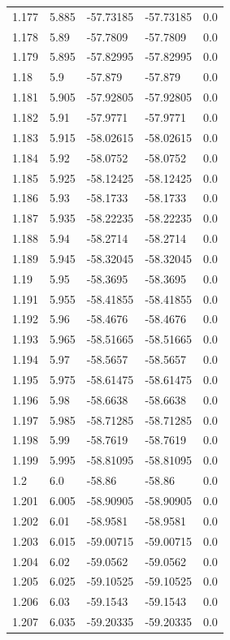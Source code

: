 \begin{tabular}{lllll}
1.177 & 5.885 & -57.73185 & -57.73185 & 0.0 \\
1.178 & 5.89 & -57.7809 & -57.7809 & 0.0 \\
1.179 & 5.895 & -57.82995 & -57.82995 & 0.0 \\
1.18 & 5.9 & -57.879 & -57.879 & 0.0 \\
1.181 & 5.905 & -57.92805 & -57.92805 & 0.0 \\
1.182 & 5.91 & -57.9771 & -57.9771 & 0.0 \\
1.183 & 5.915 & -58.02615 & -58.02615 & 0.0 \\
1.184 & 5.92 & -58.0752 & -58.0752 & 0.0 \\
1.185 & 5.925 & -58.12425 & -58.12425 & 0.0 \\
1.186 & 5.93 & -58.1733 & -58.1733 & 0.0 \\
1.187 & 5.935 & -58.22235 & -58.22235 & 0.0 \\
1.188 & 5.94 & -58.2714 & -58.2714 & 0.0 \\
1.189 & 5.945 & -58.32045 & -58.32045 & 0.0 \\
1.19 & 5.95 & -58.3695 & -58.3695 & 0.0 \\
1.191 & 5.955 & -58.41855 & -58.41855 & 0.0 \\
1.192 & 5.96 & -58.4676 & -58.4676 & 0.0 \\
1.193 & 5.965 & -58.51665 & -58.51665 & 0.0 \\
1.194 & 5.97 & -58.5657 & -58.5657 & 0.0 \\
1.195 & 5.975 & -58.61475 & -58.61475 & 0.0 \\
1.196 & 5.98 & -58.6638 & -58.6638 & 0.0 \\
1.197 & 5.985 & -58.71285 & -58.71285 & 0.0 \\
1.198 & 5.99 & -58.7619 & -58.7619 & 0.0 \\
1.199 & 5.995 & -58.81095 & -58.81095 & 0.0 \\
1.2 & 6.0 & -58.86 & -58.86 & 0.0 \\
1.201 & 6.005 & -58.90905 & -58.90905 & 0.0 \\
1.202 & 6.01 & -58.9581 & -58.9581 & 0.0 \\
1.203 & 6.015 & -59.00715 & -59.00715 & 0.0 \\
1.204 & 6.02 & -59.0562 & -59.0562 & 0.0 \\
1.205 & 6.025 & -59.10525 & -59.10525 & 0.0 \\
1.206 & 6.03 & -59.1543 & -59.1543 & 0.0 \\
1.207 & 6.035 & -59.20335 & -59.20335 & 0.0 \\

\end{tabular}
